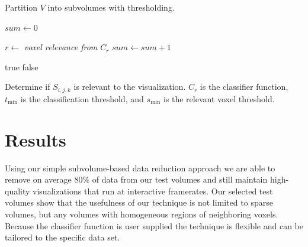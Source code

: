 \documentclass[journal]{vgtc}                %
\begin{document}
\begin{algorithm}[]
	\begin{algorithmic}[1]  
		   
		\State {} 
		\EndIf
		\EndFor
		\EndFor
		\EndFor
		\EndProcedure
	\end{algorithmic}
	\caption{Partition $V$ into subvolumes with thresholding.}
	\label{alg:partitionAndThreshold}
\end{algorithm}



\begin{algorithm}[]
	\begin{algorithmic}[1]
		\State $sum \gets 0$  
		
		
		\State $r \gets$ \textit{voxel relevance from $C_{r}$} 
		\State $sum \gets sum + 1$  
		\EndIf
		\EndFor
		
		\State \Return true 
		\Else
		\State \Return false 
		\EndIf
		\EndProcedure
	\end{algorithmic}
	\caption{Determine if $S_{i,j,k}$ is relevant to the visualization. $C_r$ is the classifier function,
		$t_{\min}$ is the classification threshold, and $s_{\min}$ is the relevant voxel threshold.}
	\label{alg:threasholdSubVolume}
\end{algorithm}

\section{Results}
Using our simple subvolume-based data reduction approach we are able to remove on average 80\% of
data from our test volumes and still maintain high-quality visualizations that run at interactive framerates. 
Our selected test volumes show that the usefulness of our technique is not limited to sparse volumes, but
any volumes with homogeneous regions of neighboring voxels. Because the classifier
function is user supplied the technique is flexible and can be tailored to the specific data set.
\end{document}
